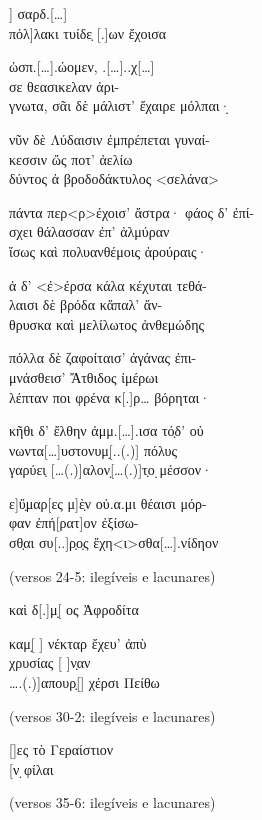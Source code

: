{\begin{gkverse}
] σαρδ.[\ldots{}]\\
     πόλ]λακι τυίδε̣ [.]ων ἔχοισα

ὠσπ.[\ldots{}].ώομεν, .[\ldots{}]..χ[\ldots{}]\\
    σε \dagger{}θεασικελαν ἀρι-\\
      γνωτα\dagger{}, σᾶι δὲ μάλιστ’ ἔχαιρε μόλπαι·̣

νῦν δὲ Λύδαισιν ἐμπρέπεται γυναί-\\
    κεσσιν ὤς ποτ’ ἀελίω\\
      δύντος ἀ βροδοδάκτυλος <σελάνα>

πάντα περ<ρ>έχοισ’ ἄστρα· φάος δ’ ἐπί-\\
    σχει θάλασσαν ἐπ’ ἀλμύραν\\
      ἴσως καὶ πολυανθέμοις ἀρούραις·

ἀ δ’ <ἐ>έρσα κάλα κέχυται τεθά-\\
    λαισι δὲ βρόδα κἄπαλ’ ἄν-\\
      θρυσκα καὶ μελίλωτος ἀνθεμώδης 

πόλλα δὲ ζαφοίταισ’ ἀγάνας ἐπι-\\
    μνάσθεισ’ Ἄτθιδος ἰμέρωι\\
      λέπταν ποι φρένα κ[.]ρ\ldots{} βόρηται·

κῆθι δ’ ἔλθην ἀμμ.[\ldots{}].ισα τό̣δ’ οὐ\\
    νωντα[\ldots{}]υστονυμ[̣..(.)] πόλυς\\
      γαρύει̣ [\ldots{}(.)]αλον[̣\ldots{}(.)]τ̣ο ̣μέσσον·

ε]ὔ̣μαρ[ες μ]ὲ̣ν οὐ.α.μι θέαισι μόρ-\\
    φαν ἐπή[ρατ]ον ἐξίσω-\\
      σθ̣αι συ[..]ρ̣ο̣ς ἔχη<ι>σθα[\ldots{}].νίδηον

\textnormal{(versos 24-5: ilegíveis e lacunares)}

      καὶ δ[.]μ{[}̣	\qquad		{]}ος Ἀφροδίτα

καμ[̣		\qquad	] νέκταρ ἔχευ’ ἀπὺ\\
    χρυσίας [		       ]ν̣αν\\
      \ldots{}.(.)]απουρ̣[\qquad		] χέρσι Πείθω

\textnormal{(versos 30-2: ilegíveis e lacunares)}

[\qquad			]ες τὸ Γεραίστιον\\
    {[}\qquad			   {]}ν ̣φίλαι

\textnormal{(versos 35-6: ilegíveis e lacunares)}
\end{gkverse}


}
